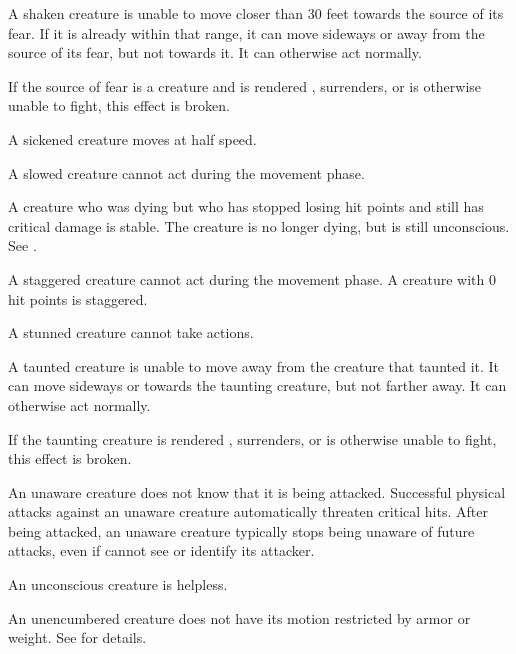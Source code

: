  A shaken creature is unable to move closer than 30 feet towards the source of its fear. If it is already within that range, it can move sideways or away from the source of its fear, but not towards it. It can otherwise act normally.

If the source of fear is a creature and is rendered \helpless, surrenders, or is otherwise unable to fight, this effect is broken.

 A sickened creature moves at half speed.

 A slowed creature cannot act during the movement phase.

 A creature who was dying but who has stopped losing hit points and still has critical damage is stable. The creature is no longer dying, but is still unconscious. See .

 A staggered creature cannot act during the movement phase. A creature with 0 hit points is staggered.

 A stunned creature cannot take actions.

 A taunted creature is unable to move away from the creature that taunted it. It can move sideways or towards the taunting creature, but not farther away. It can otherwise act normally.

If the taunting creature is rendered \helpless, surrenders, or is otherwise unable to fight, this effect is broken.

 An unaware creature does not know that it is being attacked. Successful physical attacks against an unaware creature automatically threaten critical hits. After being attacked, an unaware creature typically stops being unaware of future attacks, even if cannot see or identify its attacker.

 An unconscious creature is helpless.

 An unencumbered creature does not have its motion restricted by armor or weight. See  for details.
